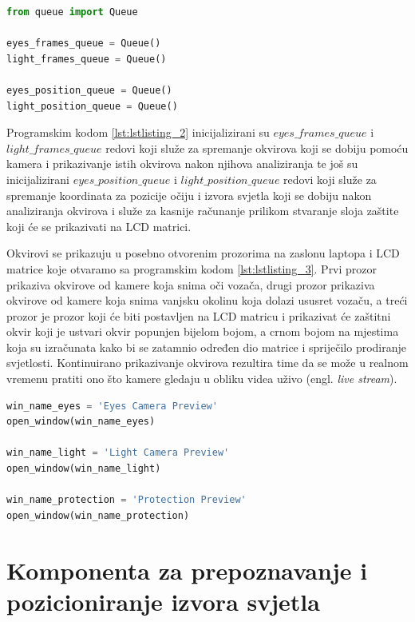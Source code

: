 \documentclass{foi}
\begin{document}
\begin{lstlisting}[language=Python, label={lst:lstlisting_2}, firstnumber=4, style=colored, caption=Uključivanje biblioteke $queue$ i inicijaliziranje redova]
from queue import Queue

eyes_frames_queue = Queue()
light_frames_queue = Queue()

eyes_position_queue = Queue()
light_position_queue = Queue()
\end{lstlisting}

Programskim kodom \ref{lst:lstlisting_2} inicijalizirani su  $eyes\_frames\_queue$ i $light\_frames\_queue$ redovi koji služe za spremanje okvirova koji se dobiju pomoću kamera i prikazivanje istih okvirova nakon njihova analiziranja te još su inicijalizirani $eyes\_position\_queue$ i $light\_position\_queue$ redovi koji služe za spremanje koordinata za pozicije očiju i izvora svjetla koji se dobiju nakon analiziranja okvirova i služe za kasnije računanje prilikom stvaranje sloja zaštite koji će se prikazivati na LCD matrici.

Okvirovi se prikazuju u posebno otvorenim prozorima na zaslonu laptopa i LCD matrice koje otvaramo sa programskim kodom \ref{lst:lstlisting_3}. Prvi prozor prikaziva okvirove od kamere koja snima oči vozača, drugi prozor prikaziva okvirove od kamere koja snima vanjsku okolinu koja dolazi ususret vozaču, a treći prozor je prozor koji će biti postavljen na LCD matricu i prikazivat će zaštitni okvir koji je ustvari okvir popunjen bijelom bojom, a crnom bojom na mjestima koja su izračunata kako bi se zatamnio određen dio matrice i spriječilo prodiranje svjetlosti. Kontinuirano prikazivanje okvirova rezultira time da se može u realnom vremenu pratiti ono što kamere gledaju u obliku videa uživo (engl. \emph{live stream}).

\begin{lstlisting}[language=Python, label={lst:lstlisting_3}, firstnumber=151, style=colored, caption=Otvaranje prozora na zaslonu]
win_name_eyes = 'Eyes Camera Preview'
open_window(win_name_eyes)

win_name_light = 'Light Camera Preview'
open_window(win_name_light)

win_name_protection = 'Protection Preview'
open_window(win_name_protection)
\end{lstlisting}

\section{Komponenta za prepoznavanje i pozicioniranje izvora svjetla}
\end{document}
